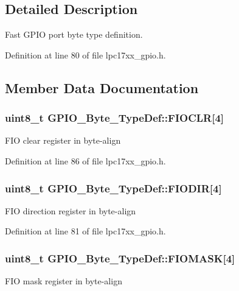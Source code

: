 \subsection{\-Detailed \-Description}
\-Fast \-G\-P\-I\-O port byte type definition. 

\-Definition at line 80 of file lpc17xx\-\_\-gpio.\-h.



\subsection{\-Member \-Data \-Documentation}
\hypertarget{struct_g_p_i_o___byte___type_def_a8b767b63e0519fca0e714338443e8780}{
\subsubsection[{\-F\-I\-O\-C\-L\-R}]{ uint8\-\_\-t {\bf \-G\-P\-I\-O\-\_\-\-Byte\-\_\-\-Type\-Def\-::\-F\-I\-O\-C\-L\-R}\mbox{[}4\mbox{]}}}\label{struct_g_p_i_o___byte___type_def_a8b767b63e0519fca0e714338443e8780}
\-F\-I\-O clear register in byte-\/align 

\-Definition at line 86 of file lpc17xx\-\_\-gpio.\-h.

\hypertarget{struct_g_p_i_o___byte___type_def_ada52a3477303674fa35bda0de6293425}{
\subsubsection[{\-F\-I\-O\-D\-I\-R}]{ uint8\-\_\-t {\bf \-G\-P\-I\-O\-\_\-\-Byte\-\_\-\-Type\-Def\-::\-F\-I\-O\-D\-I\-R}\mbox{[}4\mbox{]}}}\label{struct_g_p_i_o___byte___type_def_ada52a3477303674fa35bda0de6293425}
\-F\-I\-O direction register in byte-\/align 

\-Definition at line 81 of file lpc17xx\-\_\-gpio.\-h.

\hypertarget{struct_g_p_i_o___byte___type_def_a3351a95084187896825855ac5b06d452}{
\subsubsection[{\-F\-I\-O\-M\-A\-S\-K}]{ uint8\-\_\-t {\bf \-G\-P\-I\-O\-\_\-\-Byte\-\_\-\-Type\-Def\-::\-F\-I\-O\-M\-A\-S\-K}\mbox{[}4\mbox{]}}}\label{struct_g_p_i_o___byte___type_def_a3351a95084187896825855ac5b06d452}
\-F\-I\-O mask register in byte-\/align 

